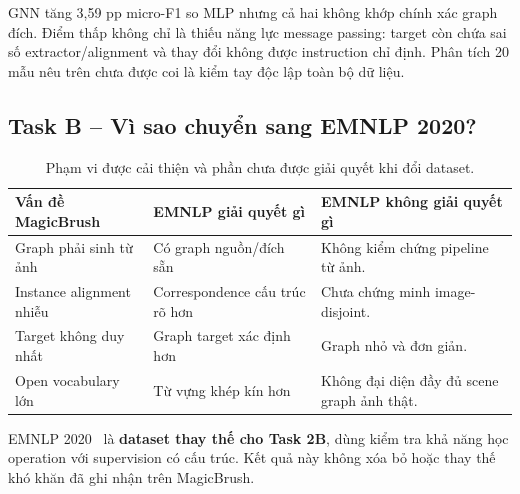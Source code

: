 GNN tăng 3,59 pp micro-F1 so MLP nhưng cả hai không khớp chính xác graph đích.
Điểm thấp không chỉ là thiếu năng lực message passing: target còn chứa sai số
extractor/alignment và thay đổi không được instruction chỉ định.
Phân tích 20 mẫu nêu trên chưa được coi là kiểm tay độc lập toàn bộ dữ liệu.


\clearpage
\subsection{Task B -- Vì sao chuyển sang EMNLP 2020?}
\begin{table}[H]\centering\small
\caption{Phạm vi được cải thiện và phần chưa được giải quyết khi đổi dataset.}
\begin{tabularx}{\linewidth}{@{}X X X@{}}\toprule
Vấn đề MagicBrush & EMNLP giải quyết gì & EMNLP không giải quyết gì\\\midrule
Graph phải sinh từ ảnh & Có graph nguồn/đích sẵn & Không kiểm chứng pipeline từ ảnh.\\
Instance alignment nhiễu & Correspondence cấu trúc rõ hơn & Chưa chứng minh image-disjoint.\\
Target không duy nhất & Graph target xác định hơn & Graph nhỏ và đơn giản.\\
Open vocabulary lớn & Từ vựng khép kín hơn & Không đại diện đầy đủ scene graph ảnh thật.\\
\bottomrule\end{tabularx}\end{table}

EMNLP 2020~\cite{he2020sgmod} là \textbf{dataset thay thế cho Task 2B},
dùng kiểm tra khả năng học operation với supervision có cấu trúc.
Kết quả này không xóa bỏ hoặc thay thế khó khăn đã ghi nhận trên MagicBrush.

